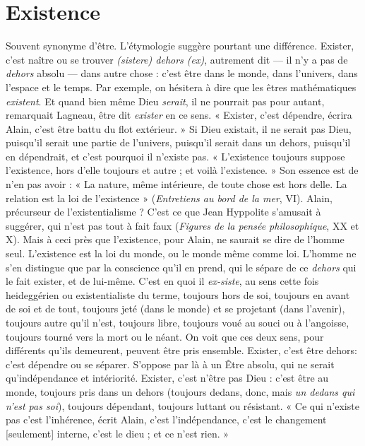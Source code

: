 \section{Existence}
Souvent synonyme d’être. L’étymologie suggère pourtant une
différence. Exister, c’est naître ou se trouver {\it (sistere) dehors
(ex)}, autrement dit — il n’y a pas de {\it dehors} absolu — dans autre chose : c’est être
dans le monde, dans l’univers, dans l’espace et le temps. Par exemple, on hésitera
à dire que les êtres mathématiques {\it existent}. Et quand bien même Dieu
{\it serait}, il ne pourrait pas pour autant, remarquait Lagneau, être dit {\it exister} en ce
sens. « Exister, c’est dépendre, écrira Alain, c’est être battu du flot extérieur. »
Si Dieu existait, il ne serait pas Dieu, puisqu'il serait une partie de l’univers,
puisqu'il serait dans un dehors, puisqu'il en dépendrait, et c’est pourquoi il
n'existe pas. « L'existence toujours suppose l'existence, hors d’elle toujours et
autre ; et voilà l'existence. » Son essence est de n’en pas avoir : « La nature,
même intérieure, de toute chose est hors delle. La relation est la loi de
l'existence » ({\it Entretiens au bord de la mer}, VI). Alain, précurseur de l’existentialisme ?
C’est ce que Jean Hyppolite s’amusait à suggérer, qui n’est pas
tout à fait faux ({\it Figures de la pensée philosophique}, XX et X). Mais à ceci près que
l'existence, pour Alain, ne saurait se dire de l’homme seul. L'existence est la loi
du monde, ou le monde même comme loi. L'homme ne s’en distingue que par
la conscience qu’il en prend, qui le sépare de ce {\it dehors} qui le fait exister, et de
lui-même. C’est en quoi il {\it ex-siste}, au sens cette fois heideggérien ou existentialiste
du terme, toujours hors de soi, toujours en avant de soi et de tout, toujours
jeté (dans le monde) et se projetant (dans l'avenir), toujours autre qu’il
n’est, toujours libre, toujours voué au souci ou à l'angoisse, toujours tourné
vers la mort ou le néant. On voit que ces deux sens, pour différents qu’ils
demeurent, peuvent être pris ensemble. Exister, c’est être dehors: c'est
dépendre ou se séparer. S’oppose par là à un Être absolu, qui ne serait qu’indépendance
et intériorité. Exister, c’est n’être pas Dieu : c’est être au monde, toujours
pris dans un dehors (toujours dedans, donc, mais {\it un dedans qui n'est pas
soi}), toujours dépendant, toujours luttant ou résistant. « Ce qui n'existe pas
c’est l’inhérence, écrit Alain, c’est l'indépendance, c’est le changement [seulement]
interne, c’est le dieu ; et ce n’est rien. »

